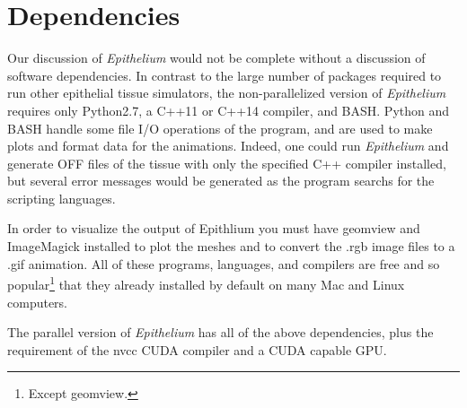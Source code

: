 \section{Dependencies}
Our discussion of \emph{Epithelium} would not be complete without a discussion of software dependencies. In contrast to the large number of packages required to run other epithelial tissue simulators, the non-parallelized version of \emph{Epithelium} requires only Python2.7, a C++11 or C++14 compiler, and BASH. Python and BASH handle some file I/O operations of the program, and are used to make plots and format data for the animations. Indeed, one could run \emph{Epithelium} and generate OFF files of the tissue with only the specified C++ compiler installed, but several error messages would be generated as the program searchs for the scripting languages.

In order to visualize the output of Epithlium you must have geomview and ImageMagick installed to plot the meshes and to convert the .rgb image files to a .gif animation. All of these programs, languages, and compilers are free and so popular\footnote{Except geomview.} that they already installed by default on many Mac and Linux computers.

The parallel version of \emph{Epithelium} has all of the above dependencies, plus the requirement of the nvcc CUDA compiler and a CUDA capable GPU. 

